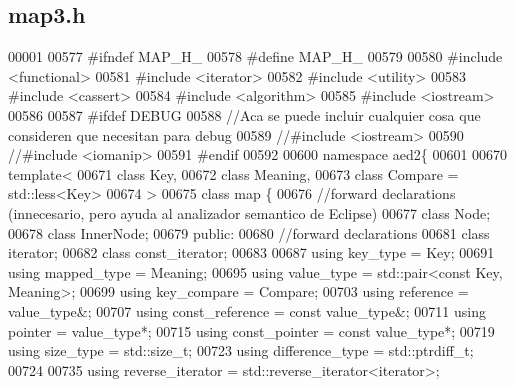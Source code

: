 \hypertarget{map3_8h_source}{\subsection{map3.\-h}
}

\begin{DoxyCode}
00001 
00577 \textcolor{preprocessor}{#ifndef MAP\_H\_}
00578 \textcolor{preprocessor}{}\textcolor{preprocessor}{#define MAP\_H\_}
00579 \textcolor{preprocessor}{}
00580 \textcolor{preprocessor}{#include <functional>}
00581 \textcolor{preprocessor}{#include <iterator>}
00582 \textcolor{preprocessor}{#include <utility>}
00583 \textcolor{preprocessor}{#include <cassert>}
00584 \textcolor{preprocessor}{#include <algorithm>}
00585 \textcolor{preprocessor}{#include <iostream>}
00586 
00587 \textcolor{preprocessor}{#ifdef DEBUG}
00588 \textcolor{preprocessor}{}\textcolor{comment}{//Aca se puede incluir cualquier cosa que consideren que necesitan para debug}
00589 \textcolor{comment}{//#include <iostream>}
00590 \textcolor{comment}{//#include <iomanip>}
00591 \textcolor{preprocessor}{#endif}
00592 \textcolor{preprocessor}{}
00600 \textcolor{keyword}{namespace }aed2\{
00601 
00670 \textcolor{keyword}{template}<
00671   \textcolor{keyword}{class }Key,
00672   \textcolor{keyword}{class }Meaning,
00673   \textcolor{keyword}{class }Compare = std::less<Key>
00674 >
00675 \textcolor{keyword}{class }map \{
00676     \textcolor{comment}{//forward declarations (innecesario, pero ayuda al analizador semantico de
       Eclipse)}
00677     \textcolor{keyword}{class }Node;
00678     \textcolor{keyword}{class }InnerNode;
00679 \textcolor{keyword}{public}:
00680     \textcolor{comment}{//forward declarations}
00681     \textcolor{keyword}{class }iterator;
00682     \textcolor{keyword}{class }const\_iterator;
00683 
00687     \textcolor{keyword}{using} key\_type = Key;
00691     \textcolor{keyword}{using} mapped\_type = Meaning;
00695     \textcolor{keyword}{using} value\_type = std::pair<const Key, Meaning>;
00699     \textcolor{keyword}{using} key\_compare = Compare;
00703     \textcolor{keyword}{using} reference = value\_type&;
00707     \textcolor{keyword}{using} const\_reference = \textcolor{keyword}{const} value\_type&;
00711     \textcolor{keyword}{using} pointer = value\_type*;
00715     \textcolor{keyword}{using} const\_pointer = \textcolor{keyword}{const} value\_type*;
00719     \textcolor{keyword}{using} size\_type = std::size\_t;
00723     \textcolor{keyword}{using} difference\_type = std::ptrdiff\_t;
00724 
00735     \textcolor{keyword}{using} reverse\_iterator = std::reverse\_iterator<iterator>;

\end{DoxyCode}
